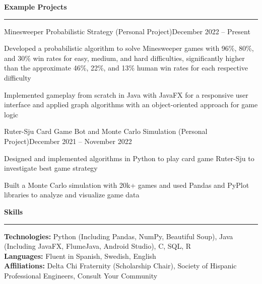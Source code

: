 \documentclass{article}
\newcommand{\horizontal}{\vspace{2pt}\hrule}
\newcommand{\sectitle}[1]{\vspace{2pt} \textbf{\large #1} \horizontal}
\newcommand{\skill}[2]{\textbf{#1:} #2}
\begin{document}
\begin{flushleft}
\sectitle{Example Projects}

    \vspace{3pt}

    \begin{subexperience}{Minesweeper Probabilistic Strategy (Personal Project)}{December 2022 -- Present}
        \item Developed a probabilistic algorithm to solve Minesweeper games with 96\%, 80\%, and 30\% win rates for easy, medium, and hard difficulties, significantly higher than the approximate 46\%, 22\%, and 13\% human win rates for each respective difficulty
        \item Implemented gameplay from scratch in Java with JavaFX for a responsive user interface and applied graph algorithms with an object-oriented approach for game logic
    \end{subexperience}

    \begin{subexperience}{Ruter-Sju Card Game Bot and Monte Carlo Simulation (Personal Project)}{December 2021 -- November 2022}
        \item Designed and implemented algorithms in Python to play card game Ruter-Sju to investigate best game strategy
        \item Built a Monte Carlo simulation with 20k+ games and used Pandas and PyPlot libraries to analyze and visualize game data
    \end{subexperience}

\sectitle{Skills}

    \vspace{3pt}
    \skill{Technologies}{Python (Including Pandas, NumPy, Beautiful Soup), Java (Including JavaFX, FlumeJava,   Android Studio), C, SQL, R} \\
    \skill{Languages}{Fluent in Spanish, Swedish, English} \\
    \skill{Affiliations}{Delta Chi Fraternity (Scholarship Chair), Society of Hispanic Professional Engineers, Consult Your Community}

\end{flushleft}
\end{document}
